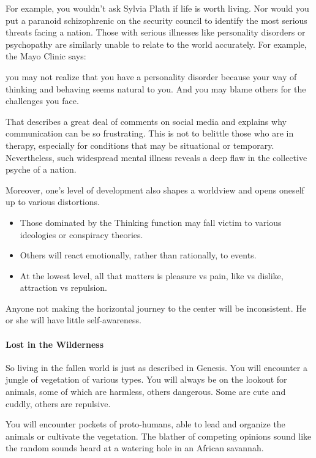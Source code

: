For example, you wouldn't ask Sylvia Plath if life is worth living. Nor would you put a paranoid schizophrenic on the security council to identify the most serious threats facing a nation. Those with serious illnesses like personality disorders or psychopathy are similarly unable to relate to the world accurately. For example, the Mayo Clinic says:

\begin{quotex}
you may not realize that you have a personality disorder because your way of thinking and behaving seems natural to you. And you may blame others for the challenges you face. 

\end{quotex}
That describes a great deal of comments on social media and explains why communication can be so frustrating. This is not to belittle those who are in therapy, especially for conditions that may be situational or temporary. Nevertheless, such widespread mental illness reveals a deep flaw in the collective psyche of a nation.

Moreover, one's level of development also shapes a worldview and opens oneself up to various distortions.

\begin{itemize}
\item Those dominated by the Thinking function may fall victim to various ideologies or conspiracy theories. 
\item Others will react emotionally, rather than rationally, to events. 
\item At the lowest level, all that matters is pleasure vs pain, like vs dislike, attraction vs repulsion. 
\end{itemize}
Anyone not making the horizontal journey to the center will be inconsistent. He or she will have little self-awareness.

\paragraph{Lost in the Wilderness}
So living in the fallen world is just as described in Genesis. You will encounter a jungle of vegetation of various types. You will always be on the lookout for animals, some of which are harmless, others dangerous. Some are cute and cuddly, others are repulsive.

You will encounter pockets of proto-humans, able to lead and organize the animals or cultivate the vegetation. The blather of competing opinions sound like the random sounds heard at a watering hole in an African savannah.

